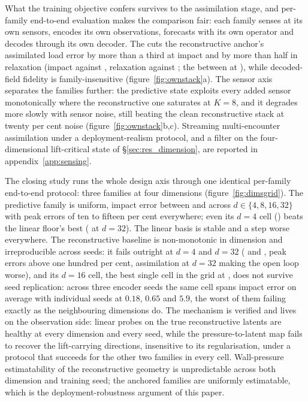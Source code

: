 What the training objective confers survives to the assimilation stage, and
per-family end-to-end evaluation makes the comparison fair: each family senses at its
own sensors, encodes its own observations, forecasts with its own operator
and decodes through its own decoder. The \PredState{}
cuts the reconstructive anchor's assimilated load error by more than a third
at impact and by more than half in relaxation
(impact \OwnClwImpRmse{} against \OwnAeLwImpRmse, relaxation
\OwnClwRelRmse{} against \OwnAeLwRelRmse; the \LiftState{} between at
\OwnClnImpRmse), while decoded-field fidelity is family-insensitive
(figure~\ref{fig:ownstack}a). The sensor axis separates the families
further: the predictive state exploits every added sensor monotonically
where the reconstructive one saturates at $K = 8$, and it degrades more
slowly with sensor noise, still beating the clean reconstructive stack at
twenty per cent noise (figure~\ref{fig:ownstack}b,c). Streaming
multi-encounter assimilation under a deployment-realism protocol, and a
filter on the four-dimensional lift-critical state of
\S\ref{sec:res_dimension}, are reported in appendix~\ref{app:sensing}.\re

The closing study runs the whole design axis through one identical
per-family end-to-end protocol: three families at four dimensions
(figure~\ref{fig:dimsgrid}). The predictive family is uniform, impact
error between \GridJepDThirtyTwoRmse{} and \GridJepDEightRmse{} across
$d \in \{4, 8, 16, 32\}$ with peak errors of ten to fifteen per cent
everywhere; even its $d = 4$ cell (\GridJepDFourRmse) beats the linear
floor's best (\GridPodDThirtyTwoRmse{} at $d = 32$). The linear basis is
stable and a step worse everywhere. The reconstructive baseline is
non-monotonic in dimension and irreproducible across seeds: it fails
outright at $d = 4$ and $d = 32$ (\GridFkDFourRmse{} and \GridFkDThirtyTwoRmse, peak errors
above one hundred per cent, assimilation at $d = 32$ making the open loop
worse), and its $d = 16$ cell, the best single cell in the
grid at \GridFkDSixteenRmse{}, does not survive seed replication: across
three encoder seeds the same cell spans \PoneFkSixteenImpactRmse{} impact
error on average with individual seeds at $0.18$, $0.65$ and $5.9$, the
worst of them failing exactly as the neighbouring dimensions do. The
mechanism is verified and lives on the observation side: linear probes on
the true reconstructive latents are healthy at every dimension and every
seed, while the pressure-to-latent map fails to recover the lift-carrying
directions, insensitive to its regularisation, under a protocol that
succeeds for the other two families in every cell. Wall-pressure
estimatability of the reconstructive geometry is unpredictable across
both dimension and training seed; the anchored families are uniformly
estimatable, which is the deployment-robustness argument of this paper.\re


